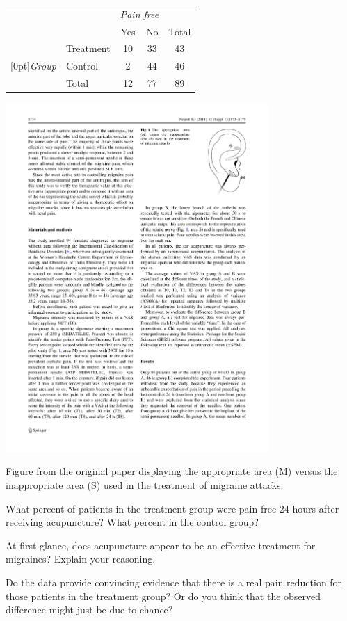 {\noindent\begin{minipage}[l]{0.4\textwidth}
\begin{tabular}{ll  cc c} 
			&				& \multicolumn{2}{c}{\textit{Pain free}} \\
\cline{3-4}
			&							& Yes 	& No 	& Total	\\
\cline{2-5}
							&Treatment 	& 10	 	& 33		& 43 	\\
\raisebox{1.5ex}[0pt]{\emph{Group}}	& Control		& 2	 	& 44 	 	& 46 \\
\cline{2-5}
							&Total		& 12		& 77		& 89
\end{tabular}
\end{minipage}
\begin{minipage}[c]{0.05\textwidth}
\end{minipage}
\begin{minipage}[c]{0.27\textwidth}
\begin{center}
\includegraphics[width = 0.75\textwidth]{01/figures/eoce/images/earacupuncture}
\end{center}
\end{minipage}
\begin{minipage}[c]{0.25\textwidth}
{\footnotesize Figure from the original paper displaying the appropriate area (M) versus the inappropriate area (S) used in the treatment of migraine attacks.}
\end{minipage}
\begin{parts}
\item What percent of patients in the treatment group were pain free 24 hours after receiving acupuncture? What percent in the control group?
\item At first glance, does acupuncture appear to be an effective treatment for migraines? Explain your reasoning.
\item Do the data provide convincing evidence that there is a real pain reduction for those patients in the treatment group? Or do you think that the observed difference might just be due to chance?
\end{parts}
}
{}

